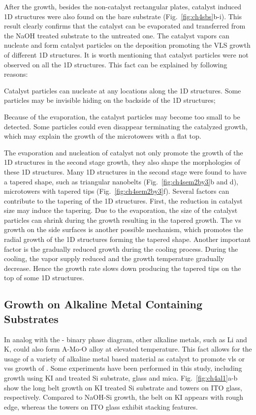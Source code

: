 After the growth, besides the non-catalyst rectangular plates, catalyst induced 1D structures were also found on the bare substrate (Fig.~\ref{fig:ch4sbs}b-i). This result clearly confirms that the catalyst can be evaporated and transferred from the NaOH treated substrate to the untreated one. The catalyst vapors can nucleate and form catalyst particles on the  deposition promoting the VLS growth of different 1D structures. It is worth mentioning that catalyst particles were not observed on all the 1D structures. This fact can be explained by following reasons:
\begin{enumerate*}[label=\itshape\alph*\upshape)]
\item Catalyst particles can nucleate at any locations along the 1D structures. Some particles may be invisible hiding on the backside of the 1D structures;
\item Because of the evaporation, the catalyst particles may become too small to be detected. Some particles could even disappear terminating the catalyzed growth, which may explain the growth of the microtowers with a flat top.
\end{enumerate*} The evaporation and nucleation of catalyst not only promote the growth of the 1D structures in the second stage growth, they also shape the morphologies of these 1D structures. Many 1D structures in the second stage were found to have a tapered shape, such as triangular nanobelts (Fig.~\ref{fig:ch4sem2by3}b and d), microtowers with tapered tips (Fig.~\ref{fig:ch4sem2by3}f). Several factors can contribute to the tapering of the 1D structures. First, the reduction in catalyst size may induce the tapering. Due to the evaporation, the size of the catalyst particles can shrink during the growth resulting in the tapered growth. The \gls{vs} growth on the side surfaces is another possible mechanism, which promotes the radial growth of the 1D structures forming the tapered shape. Another important factor is the gradually reduced growth during the cooling process. During the cooling, the  vapor supply reduced and the growth temperature gradually decrease. Hence the growth rate slows down producing the tapered tips on the top of some 1D structures.

\subsection{Growth on Alkaline Metal Containing Substrates}
In analog with the - binary phase diagram, other alkaline metals, such as Li and K, could also form A-Mo-O alloy at elevated temperature. This fact allows for the usage of a variety of alkaline metal based material as catalyst to promote \gls{vls} or \gls{vss} growth of . Some experiments have been performed in this study, including growth using KI and  treated Si substrate, glass and mica. Fig.~\ref{fig:ch4al1}a-b show the long belt growth on KI treated Si substrate and towers on ITO glass, respectively. Compared to NaOH-Si growth, the belt on KI appears with rough edge, whereas the towers on ITO glass exhibit stacking features. 

